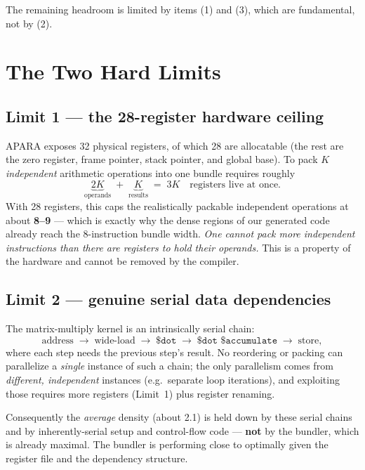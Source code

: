 \documentclass[11pt,a4paper]{article}
\begin{document}
The remaining headroom is limited by items (1) and (3), which are fundamental, not by (2).

\section{The Two Hard Limits}

\subsection*{Limit 1 --- the 28-register hardware ceiling}

APARA exposes 32 physical registers, of which 28 are allocatable (the rest are the zero
register, frame pointer, stack pointer, and global base). To pack $K$ \emph{independent}
arithmetic operations into one bundle requires roughly
\[
  \underbrace{2K}_{\text{operands}} \;+\; \underbrace{K}_{\text{results}} \;=\; 3K
  \quad\text{registers live at once.}
\]
With 28 registers, this caps the realistically packable independent operations at about
\textbf{8--9} --- which is exactly why the dense regions of our generated code already reach
the 8-instruction bundle width. \emph{One cannot pack more independent instructions than
there are registers to hold their operands.} This is a property of the hardware and cannot
be removed by the compiler.

\subsection*{Limit 2 --- genuine serial data dependencies}

The matrix-multiply kernel is an intrinsically serial chain:
\[
  \text{address} \;\to\; \text{wide-load} \;\to\; \texttt{\$dot} \;\to\;
  \texttt{\$dot \$accumulate} \;\to\; \text{store},
\]
where each step needs the previous step's result. No reordering or packing can parallelize
a \emph{single} instance of such a chain; the only parallelism comes from \emph{different,
independent} instances (e.g.\ separate loop iterations), and exploiting those requires more
registers (Limit~1) plus register renaming.

\medskip
\noindent Consequently the \emph{average} density (about 2.1) is held down by these serial
chains and by inherently-serial setup and control-flow code --- \textbf{not} by the bundler,
which is already maximal. The bundler is performing close to optimally given the register
file and the dependency structure.
\end{document}
